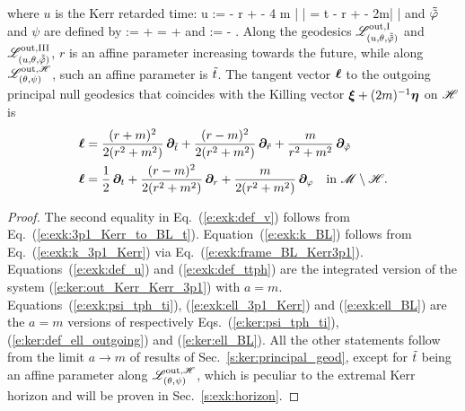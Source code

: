 \begin{prop}
\begin{itemize}
\begin{subequations}
\end{subequations}
where $u$ is the Kerr retarded time:
\be \label{e:exk:def_u}
    u := \ti - r +  - 4 m \ln \left|  \right|
      = t  - r +  - 2m\ln\left|  \right|
\ee
and $\tilde{{\tilde\varphi}}$ and $\psi$ are defined by
\be \label{e:exk:def_ttph}
    \tilde{\tph} := \tph +  = \ph + 
\ee
and
\be \label{e:exk:psi_tph_ti}
    \psi := \tph -  .
\ee
Along the geodesics $\mathscr{L}^{\rm out, I}_{(u,\theta,\tilde{{\tilde\varphi}})}$ and $\mathscr{L}^{\rm out, III}_{(u,\theta,\tilde{{\tilde\varphi}})}$,
$r$ is an affine parameter increasing towards the future,
while along $\mathscr{L}^{{\rm out},\mathscr{H}}_{(\theta,\psi)}$, such an affine parameter is ${\tilde t}$. The tangent vector $\bm{\ell}$ to the outgoing principal null geodesics
that coincides with the Killing vector $\bm{\xi} + (2m)^{-1} \bm{\eta}$ on $\mathscr{H}$ is
\begin{subequations}
\begin{align}
 \bm{\ell} & = \frac{(r + m)^2}{2(r^2 + m^2)}\, \bm{\partial}_{{\tilde t}}
  + \frac{(r - m)^2}{2(r^2 + m^2)} \,  \bm{\partial}_{\tilde{r}}
  + \frac{m}{r^2 + m^2} \, \bm{\partial}_{{\tilde\varphi}} \label{e:exk:ell_3p1_Kerr}\\
 \bm{\ell} & =  \frac{1}{2}\, \bm{\partial}_t
            + \frac{(r - m)^2}{2(r^2 + m^2)} \,  \bm{\partial}_r
            + \frac{m}{2(r^2 + m^2)} \, \bm{\partial}_\varphi
            \quad \mbox{in}\ \mathscr{M}\setminus\mathscr{H} . \label{e:exk:ell_BL}
\end{align}
\end{subequations}
\end{itemize}
\end{prop}
\begin{proof}
The second equality in Eq.~(\ref{e:exk:def_v}) follows from Eq.~(\ref{e:exk:3p1_Kerr_to_BL_t}).
Equation~(\ref{e:exk:k_BL}) follows from Eq.~(\ref{e:exk:k_3p1_Kerr}) via Eq.~(\ref{e:exk:frame_BL_Kerr3p1}).
Equations~(\ref{e:exk:def_u}) and (\ref{e:exk:def_ttph}) are the integrated version of the system (\ref{e:ker:out_Kerr_Kerr_3p1}) with $a=m$. Equations~(\ref{e:exk:psi_tph_ti}), (\ref{e:exk:ell_3p1_Kerr})
and (\ref{e:exk:ell_BL}) are the $a=m$ versions of respectively
Eqs.~(\ref{e:ker:psi_tph_ti}), (\ref{e:ker:def_ell_outgoing}) and (\ref{e:ker:ell_BL}).
All the other statements follow from the limit $a\to m$ of results of Sec.~\ref{s:ker:principal_geod},
except for ${\tilde t}$ being an affine parameter along $\mathscr{L}^{{\rm out},\mathscr{H}}_{(\theta,\psi)}$, which
is peculiar to the extremal Kerr horizon and will
be proven in Sec.~\ref{s:exk:horizon}.
\end{proof}

